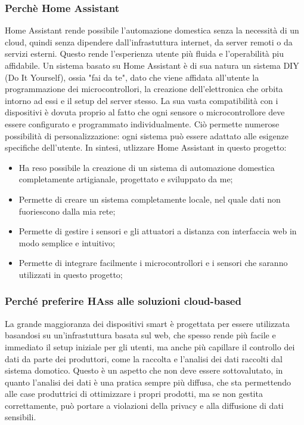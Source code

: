 \documentclass[11pt, a4paper]{article}
\begin{document}
\subsubsection{Perchè Home Assistant}
Home Assistant rende possibile l'automazione domestica senza la necessità di un cloud,
quindi senza dipendere dall'infrastuttura internet, da server remoti o da servizi esterni.
Questo rende l'esperienza utente più fluida e l'operabilità piu affidabile.
Un sistema basato su Home Assistant è di sua natura un sistema DIY (Do It Yourself), ossia "fai da te", dato che viene affidata
all'utente la programmazione dei microcontrollori, la creazione dell'elettronica che orbita
intorno ad essi e il setup del server stesso. La sua vasta compatibilità
con i dispositivi è dovuta proprio al fatto che ogni sensore o microcontrollore
deve essere configurato e programmato individualmente. Ciò permette numerose possibilità di
personalizzazione: ogni sistema può essere adattato alle esigenze specifiche dell'utente.
In sintesi, utlizzare Home Assistant in questo progetto:
\begin{itemize}
    \item Ha reso possibile la creazione di un sistema di automazione domestica completamente artigianale,
        progettato e sviluppato da me;
    \item Permette di creare un sistema completamente locale, nel quale dati non fuoriescono dalla mia rete;
    \item Permette di gestire i sensori e gli attuatori a distanza con interfaccia web in modo semplice e intuitivo;
    \item Permette di integrare facilmente i microcontrollori e i sensori che saranno utilizzati in questo progetto;
\end{itemize}

\subsubsection{Perché preferire HAss alle soluzioni cloud-based}
La grande maggioranza dei dispositivi smart è progettata per essere utilizzata basandosi su
un'infrastuttura basata sul web, che spesso rende più facile e immediato il setup iniziale per gli utenti,
ma anche più capillare il controllo dei dati da parte dei produttori, come la raccolta e l'analisi dei dati
raccolti dal sistema domotico. Questo è un aspetto che non deve essere sottovalutato, in quanto
l'analisi dei dati è una pratica sempre più diffusa, che sta permettendo alle case produttrici di
ottimizzare i propri prodotti, ma se non gestita correttamente, può portare a violazioni della privacy
e alla diffusione di dati sensibili.
\end{document}
